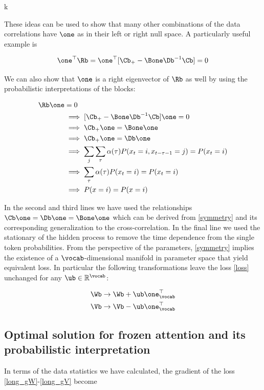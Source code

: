 k\documentclass{article}
\begin{document}
These ideas can be used to show that many other combinations of the data correlations have $\one$ as in their left or right null space. A particularly useful example is 

\begin{equation}\label{rnull_left}
    \one^\top\Rb = \one^\top[\Cb_+ - \Bone\Db^{-1}\Cb] = 0  
\end{equation}

We can also show that $\one$ is a right eigenvector of $\Rb$ as well by using the probabilistic interpretations of the blocks:

\begin{align}
    \Rb \one &= 0 \label{rnull_right}\\
    &\implies [\Cb_+ - \Bone\Db^{-1}\Cb]\one = 0 \\
    &\implies \Cb_+\one = \Bone\one \\
    &\implies \Cb_+\one = \Db\one \\
    &\implies \sum_j \sum_\tau \alpha(\tau)P(x_{t} = i, x_{t-\tau-1} = j) = P(x_t = i) \\
    &\implies \sum_\tau \alpha(\tau)P(x_{t} = i) = P(x_t = i) \\
    &\implies P(x = i) = P(x = i)
\end{align}

In the second and third lines we have used the relationships $\Cb\one = \Db\one = \Bone\one $ which can be derived from \eqref{symmetry} and its corresponding generalization to the cross-correlation. In the final line we used the stationary of the hidden process to remove the time dependence from the single token probabilities. From the perspective of the parameters, \eqref{symmetry} implies the existence of a $\vocab$-dimensional manifold in parameter space that yield equivalent loss. In particular the following transformations leave the loss \eqref{loss} unchanged for any $\ub \in \mathbb{R}^{\vocab}$:

\begin{align}\label{param_degen}
    \Wb &\to \Wb + \ub\one_{\vocab}^\top \\
    \Vb &\to \Vb - \ub\one_\vocab^\top
\end{align}


\subsection{Optimal solution for frozen attention and its probabilistic interpretation}
In terms of the data statistics we have calculated, the gradient of the loss \eqref{long_gW}-\eqref{long_gV} become 
\end{document}

